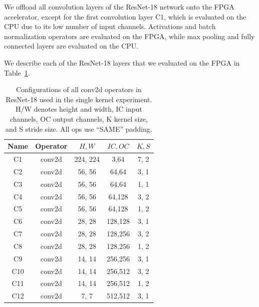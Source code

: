 \documentclass[sigconf]{acmart}
\begin{document}
We offload all convolution layers of the ResNet-18 network onto the FPGA accelerator, except for the first convolution layer C1, which is evaluated on the CPU due to its low number of input channels.
Activations and batch normalization operators are evaluated on the FPGA, while max pooling and fully connected layers are evaluated on the CPU.

We describe each of the ResNet-18 layers that we evaluated on the FPGA in Table~\ref{table:resnet18}.

\begin{table}[t]
  \begin{footnotesize}
	\begin{tabular}{ccccc}
	\hline
	Name & Operator & $H, W$ & $IC, OC$ & $K, S$ \\
	\hline
	C1  & conv2d & 224, 224 & 3,64  & 7, 2 \\
	C2  & conv2d & 56, 56 & 64,64   & 3, 1 \\
	C3  & conv2d & 56, 56 & 64,64   & 1, 1 \\
	C4  & conv2d & 56, 56 & 64,128  & 3, 2 \\
	C5  & conv2d & 56, 56 & 64,128  & 1, 2 \\
	C6  & conv2d & 28, 28 & 128,128 & 3, 1 \\
	C7  & conv2d & 28, 28 & 128,256 & 3, 2 \\
	C8  & conv2d & 28, 28 & 128,256 & 1, 2 \\
	C9  & conv2d & 14, 14 & 256,256 & 3, 1 \\
	C10 & conv2d & 14, 14 & 256,512 & 3, 2 \\
	C11 & conv2d & 14, 14 & 256,512 & 1, 2 \\
	C12 & conv2d &  7,  7 & 512,512 & 3, 1 \\
	\hline
	\end{tabular}
  \end{footnotesize}
	\centering
	\caption{\small{Configurations of all conv2d operators in ResNet-18 used in the single kernel experiment.
	H/W denotes height and width, IC input channels, OC output channels,
	K kernel size, and S stride size. All ops use ``SAME'' padding.}}
	\label{table:resnet18}
\end{table}
\end{document}
